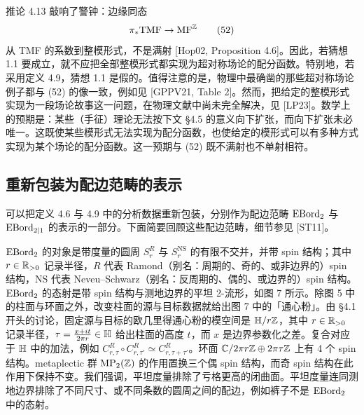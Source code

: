 \begin{remark}[4.14]
推论 4.13 敲响了警钟：边缘同态
\begin{equation}
\pi_*\mathrm{TMF}\to\mathrm{MF}^{\mathbb{Z}}
\tag{52}
\end{equation}
从 TMF 的系数到整模形式，不是满射 [Hop02, Proposition 4.6]。因此，若猜想 1.1 要成立，就不应把全部整模形式都实现为超对称场论的配分函数。特别地，若采用定义 4.9，猜想 1.1 是假的。值得注意的是，物理中最确凿的那些超对称场论例子都与 (52) 的像一致，例如见 [GPPV21, Table 2]。然而，把给定的整模形式实现为一段场论故事这一问题，在物理文献中尚未完全解决，见 [LP23]。数学上的预期是：某些（手征）理论无法按下文 §4.5 的意义向下扩张，而向下扩张未必唯一。这既使某些模形式无法实现为配分函数，也使给定的模形式可以有多种方式实现为某个场论的配分函数。这一预期与 (52) 既不满射也不单射相符。
\end{remark}

\subsection{重新包装为配边范畴的表示}
可以把定义 4.6 与 4.9 中的分析数据重新包装，分别作为配边范畴 $\operatorname{EBord}_2$ 与 $\operatorname{EBord}_{2|1}$ 的表示的一部分。下面简要回顾这些配边范畴，细节参见 [ST11]。

$\operatorname{EBord}_2$ 的对象是带度量的圆周 $S^R_r$ 与 $S^{\mathrm{NS}}_r$ 的有限不交并，并带 spin 结构；其中 $r\in\mathbb{R}_{>0}$ 记录半径，$R$ 代表 Ramond（别名：周期的、奇的、或非边界的）spin 结构，$\mathrm{NS}$ 代表 Neveu–Schwarz（别名：反周期的、偶的、或边界的）spin 结构。$\operatorname{EBord}_2$ 的态射是带 spin 结构与测地边界的平坦 2-流形，如图 7 所示。除图 5 中的柱面与环面之外，改变柱面的源与目标数据就给出图 7 中的「通心粉」。由 §4.1 开头的讨论，固定源与目标的欧几里得通心粉的模空间是 $\mathbb{H}/r\mathbb{Z}$，其中 $r\in\mathbb{R}_{>0}$ 记录半径，$\tau=\frac{x+it}{2\pi r}\in\mathbb{H}$ 给出柱面的高度 $t$，而 $x$ 是边界参数化之差。复合对应于 $\mathbb{H}$ 中的加法，例如 $C^R_{r,\tau}\circ C^R_{r,\tau'}\simeq C^R_{r,\tau+\tau'}$。环面 $\mathbb{C}/2\pi r\mathbb{Z}\oplus2\pi\tau\mathbb{Z}$ 上有 4 个 spin 结构。metaplectic 群 $\operatorname{MP}_2(\mathbb{Z})$ 的作用置换三个偶 spin 结构，而奇 spin 结构在此作用下保持不变。我们强调，平坦度量排除了亏格更高的闭曲面。平坦度量连同测地边界排除了不同尺寸、或不同条数的圆周之间的配边，例如裤子不是 $\operatorname{EBord}_2$ 中的态射。

